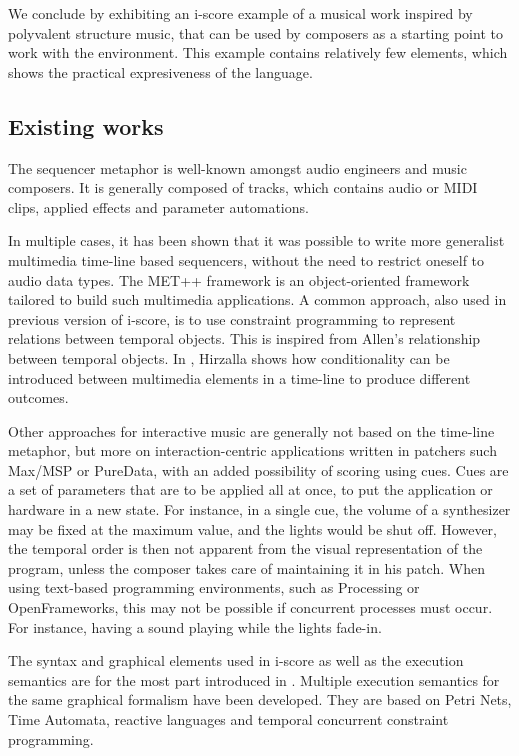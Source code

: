 \documentclass{article}
\begin{document}
We conclude by exhibiting an i-score example of a musical work inspired by polyvalent structure music,
that can be used by composers as a starting point to work with the environment. 
This example contains relatively few elements, which shows the practical expresiveness of the language.

\subsection{Existing works}
The sequencer metaphor is well-known amongst audio engineers and music composers. 
It is generally composed of tracks, which contains audio or MIDI clips, applied effects 
and parameter automations.

In multiple cases, it has been shown that it was possible to write 
more generalist multimedia time-line based sequencers, without the need to restrict oneself 
to audio data types. 
The MET++ framework\cite{ackermann1994direct} is an object-oriented framework 
tailored to build such multimedia applications.
A common approach, also used in previous version of i-score, is to use constraint programming 
to represent relations between temporal objects\cite{song1999interactive, allombert2006concurrent, toro2010concurrent}. 
This is inspired from Allen's relationship between temporal objects.
In \cite{hirzalla1995temporal}, Hirzalla shows how conditionality can be introduced between multimedia elements in a time-line to produce different outcomes.

Other approaches for interactive music are generally not based on the time-line metaphor, 
but more on interaction-centric applications written in patchers such Max/MSP or PureData, 
with an added possibility of scoring using cues. 
Cues are a set of parameters that are to be applied all at once, to put the application or hardware in a new state.
For instance, in a single cue, the volume of a synthesizer may be fixed at the maximum value, and the lights would be shut off.
However, the temporal order is then not apparent from the visual representation of the program, 
unless the composer takes care of maintaining it in his patch.
When using text-based programming environments, such as Processing or OpenFrameworks, this may not be possible if concurrent processes must occur. For instance, having a sound playing while the lights fade-in.

The syntax and graphical elements used in i-score as well as the 
execution semantics are for the most part introduced in \cite{celerier2015ossia, baltazar2014score}.
Multiple execution semantics for the same graphical formalism have been developed. 
They are based on Petri Nets\cite{allombert2007system}, Time Automata\cite{arias2015exploiting}, reactive languages\cite{arias2014executing} and temporal concurrent constraint programming\cite{toro2010model}.
\end{document}

